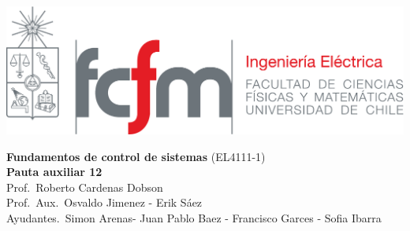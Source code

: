 \documentclass[
  11pt,
  letterpaper,
   addpoints,
   answers
  ]{exam}
\begin{document}
\noindent
\begin{minipage}{0.47\textwidth}
\includegraphics[width=\textwidth]{../fcfm_die}
\end{minipage}
\begin{minipage}{0.53\textwidth}
\begin{center} 
\large\textbf{Fundamentos de control de sistemas} (EL4111-1) \\
\large\textbf{Pauta auxiliar 12} \\
\small Prof.~Roberto Cardenas Dobson\\
\small Prof.~Aux.~Osvaldo Jimenez - Erik Sáez\\
\small Ayudantes.~Simon Arenas- Juan Pablo Baez - Francisco Garces - Sofia Ibarra\\
\end{center}
\end{minipage}

\vspace{0.5cm}
\noindent
\vspace{.85cm}
\end{document}
